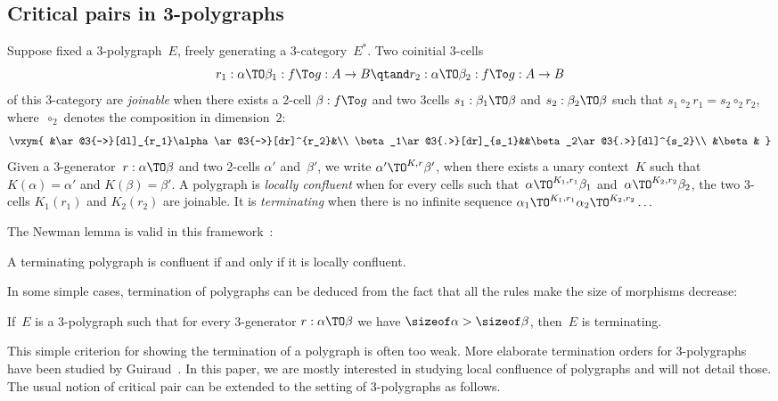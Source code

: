 \documentclass{LMCS}
\newenvironment{lemma}{\begin{lem}}{\end{lem}}
\begin{document}
\subsection{Critical pairs in 3-polygraphs}
\label{sec:cp-3}
Suppose fixed a 3-polygraph~$E$, freely generating a 3-category~$E^*$. Two
coinitial 3-cells
\[
r_1:\alpha\TO\beta_1:f\To g:A\to B
\qtand
r_2:\alpha\TO\beta_2:f\To g:A\to B
\]
of this 3-category are \emph{joinable} when there exists a 2-cell $\beta:f\To g$
and two 3\nbd cells $s_1:\beta_1\TO\beta$ and $s_2:\beta_2\TO\beta$ such that
$s_1\circ_2 r_1=s_2\circ_2 r_2$, where~$\circ_2$ denotes the composition in
dimension~$2$:
\[
\vxym{
  &\ar@3{->}[dl]_{r_1}\alpha\ar@3{->}[dr]^{r_2}&\\
  \beta_1\ar@3{.>}[dr]_{s_1}&&\beta_2\ar@3{.>}[dl]^{s_2}\\
  &\beta&
}
\]
Given a 3-generator~$r:\alpha\TO\beta$ and two 2-cells $\alpha'$ and~$\beta'$,
we write $\alpha'\TO^{K,r}\beta'$,
when there exists a unary context~$K$ such that~$K(\alpha)=\alpha'$ and
$K(\beta)=\beta'$. A polygraph is \emph{locally confluent} when for every cells
such that~$\alpha\TO^{K_1,r_1}\beta_1$ and~$\alpha\TO^{K_2,r_2}\beta_2$, the two
3-cells $K_1(r_1)$ and $K_2(r_2)$ are joinable. It is \emph{terminating} when
there is no infinite sequence
$\alpha_1\TO^{K_1,r_1}\alpha_2\TO^{K_2,r_2}\ldots$


The Newman lemma is valid in this
framework~\cite{guiraud-malbos:higher-cat-fdt}:

\begin{lemma}
  \label{lemma:newman-polygraphs}
  A terminating polygraph is confluent if and only if it is locally confluent.
\end{lemma}

In some simple cases, termination of polygraphs can be deduced from the fact
that all the rules make the size of morphisms decrease:
\begin{lemma}
  \label{lemma:size-term}
  If~$E$ is a 3-polygraph such that for every 3-generator $r:\alpha\TO\beta$ we
  have $\sizeof\alpha>\sizeof\beta$, then~$E$ is terminating.
\end{lemma}
\noindent
This simple criterion for showing the termination of a polygraph is often too
weak. More elaborate termination orders for 3-polygraphs have been studied by
Guiraud~\cite{guiraud:termination-3-rewr}. In this paper, we are mostly
interested in studying local confluence of polygraphs and will not detail those.
The usual notion of critical pair can be extended to the setting of 3-polygraphs
as follows.
\end{document}
